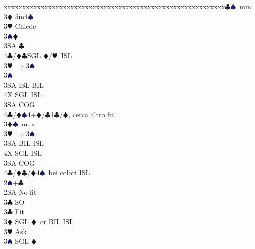 \documentclass[a4paper,italian]{article}
\newcommand{\BC}{\textcolor{OliveGreen}{$\clubsuit$}}
\newcommand{\BD}{\textcolor{RedOrange}{$\vardiamondsuit$}}
\newcommand{\BH}{\textcolor{Red2}{$\varheartsuit${}}}
\newcommand{\BS}{\textcolor{MidnightBlue}{$\spadesuit${}}}
\newenvironment{bidtable}
{\begin{tabbing}

    xxxxxx\=xxxxxx\=xxxxxx\=xxxxxx\=xxxxxx\=xxxxxx\=xxxxxx\=xxxxxx\=xxxxxx\=xxxxxx\=\kill}
{\end{tabbing} }%
\begin{document}
\begin{multicols}{2}
\begin{bidtable}
                                            3\BC {}\BS\ min\+\\
                                            3\BD \> 5m4\BS \+\\
                                            3\BH \> Chiede\+\\
                                            3\BS {}\BD \\
                                            3SA \BC \\
                                            4\BC/\BD {}\BC SGL \BD /\BH\ ISL \-\-\\
                                            3\BH \> $\Rightarrow$3\BS\+\\
                                            3\BS\+\\
                                            3SA \> ISL BIL\\
                                            4X \> SGL ISL\-\-\\
                                            3SA \> COG\\
                                            4\BC/\BD {}\BS4+\BD/\BC1\BC/\BD, cerca altro fit \-\\
                                            3\BD {}\BS\ max\+\\
                                            3\BH \> $\Rightarrow$3\BS\+\\
                                            3SA \> BIL ISL\\
                                            4X \> SGL ISL\-\\
                                            3SA \> COG\\
                                            4\BC/\BD {}\BC /\BD 4\BS\ bei colori ISL\-\-\\
                                            2\BS {}+\BC \+\\
                                            2SA \> No fit\+\\
                                            3\BC \> SO\-\\
                                            3\BC \> Fit\+\\
                                            3\BD \> SGL \BD\ or BIL ISL\+\\
                                            3\BH \> Ask\+\\
                                            3\BS \> SGL \BD \\

\end{bidtable}
\end{multicols}
\end{document}
